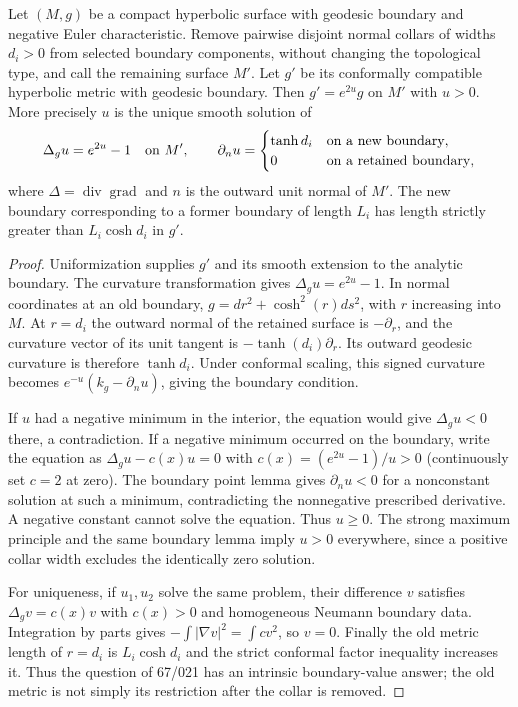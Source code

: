 \begin{theorem}\label{A2-collar}
Let $(M,g)$ be a compact hyperbolic surface with geodesic boundary and negative Euler characteristic. Remove pairwise disjoint normal collars of widths $d_i>0$ from selected boundary components, without changing the topological type, and call the remaining surface $M'$. Let $g'$ be its conformally compatible hyperbolic metric with geodesic boundary. Then $g'=e^{2u}g$ on $M'$ with $u>0$. More precisely $u$ is the unique smooth solution of
\[
\Delta_g u=e^{2u}-1\quad\hbox{on }M',\qquad
\partial_{n}u=\begin{cases}\tanh d_i&\hbox{on a new boundary},\\0&\hbox{on a retained boundary},\end{cases}
\]
where $\Delta=\operatorname{div}\operatorname{grad}$ and $n$ is the outward unit normal of $M'$. The new boundary corresponding to a former boundary of length $L_i$ has length strictly greater than $L_i\cosh d_i$ in $g'$.
\end{theorem}
\begin{proof}
Uniformization supplies $g'$ and its smooth extension to the analytic boundary. The curvature transformation gives $\Delta_g u=e^{2u}-1$. In normal coordinates at an old boundary, $g=dr^2+\cosh^2(r)ds^2$, with $r$ increasing into $M$. At $r=d_i$ the outward normal of the retained surface is $-\partial_r$, and the curvature vector of its unit tangent is $-\tanh(d_i)\partial_r$. Its outward geodesic curvature is therefore $\tanh d_i$. Under conformal scaling, this signed curvature becomes $e^{-u}(k_g-\partial_nu)$, giving the boundary condition.

If $u$ had a negative minimum in the interior, the equation would give $\Delta_g u<0$ there, a contradiction. If a negative minimum occurred on the boundary, write the equation as $\Delta_g u-c(x)u=0$ with $c(x)=(e^{2u}-1)/u>0$ (continuously set $c=2$ at zero). The boundary point lemma gives $\partial_nu<0$ for a nonconstant solution at such a minimum, contradicting the nonnegative prescribed derivative. A negative constant cannot solve the equation. Thus $u\geq0$. The strong maximum principle and the same boundary lemma imply $u>0$ everywhere, since a positive collar width excludes the identically zero solution.

For uniqueness, if $u_1,u_2$ solve the same problem, their difference $v$ satisfies $\Delta_gv=c(x)v$ with $c(x)>0$ and homogeneous Neumann boundary data. Integration by parts gives $-\int|\nabla v|^2=\int c v^2$, so $v=0$. Finally the old metric length of $r=d_i$ is $L_i\cosh d_i$ and the strict conformal factor inequality increases it. Thus the question of 67/021 has an intrinsic boundary-value answer; the old metric is not simply its restriction after the collar is removed.
\end{proof}


